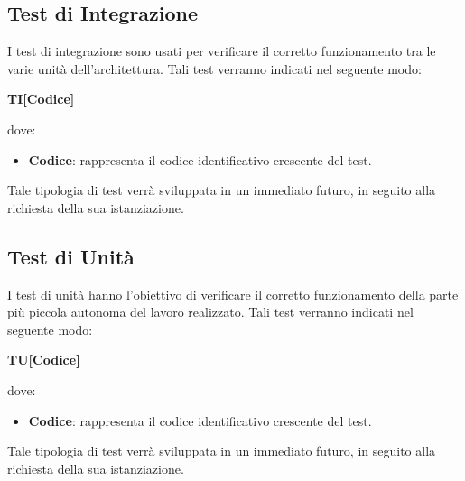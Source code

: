 \subsection{Test di Integrazione}
I test di integrazione sono usati per verificare il corretto funzionamento tra le varie unità dell'architettura. Tali test verranno indicati nel seguente modo:\\
	\centerline{\textbf{TI[Codice]}}
dove:
\begin{itemize}
	\item \textbf{Codice}: rappresenta il codice identificativo crescente del test.
\end{itemize}
Tale tipologia di test verrà sviluppata in un immediato futuro, in seguito alla richiesta della sua istanziazione.

\subsection{Test di Unità}
I test di unità hanno l'obiettivo di verificare il corretto funzionamento della parte più piccola autonoma del lavoro realizzato. Tali test verranno indicati nel seguente modo:\\
	\centerline{\textbf{TU[Codice]}}
dove:
\begin{itemize}
	\item \textbf{Codice}: rappresenta il codice identificativo crescente del test.
\end{itemize}
Tale tipologia di test verrà sviluppata in un immediato futuro, in seguito alla richiesta della sua istanziazione.
